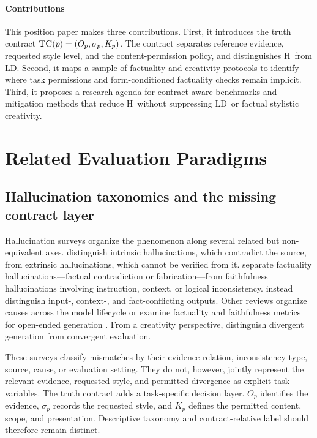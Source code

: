 \documentclass{clv2025}
\newcommand{\TC}{\textsc{TC}}
\newcommand{\LD}{\textsc{LD}}
\newcommand{\Hall}{\textsc{H}}
\begin{document}
\paragraph{Contributions}
This position paper makes three contributions.
First, it introduces the truth contract $\TC(p)=(O_p,\sigma_p,K_p)$.
The contract separates reference evidence, requested style level, and the content-permission policy, and distinguishes \Hall\ from \LD.
Second, it maps a sample of factuality and creativity protocols to identify where task permissions and form-conditioned factuality checks remain implicit.
Third, it proposes a research agenda for contract-aware benchmarks and mitigation methods that reduce \Hall\ without suppressing \LD\ or factual stylistic creativity.

\section{Related Evaluation Paradigms}\label{sec:related}

\subsection{Hallucination taxonomies and the missing contract layer}

Hallucination surveys organize the phenomenon along several related but non-equivalent axes.
\citet{ji_survey_2023} distinguish intrinsic hallucinations, which contradict the source, from extrinsic hallucinations, which cannot be verified from it.
\citet{huang_survey_2025} separate factuality hallucinations---factual contradiction or fabrication---from faithfulness hallucinations involving instruction, context, or logical inconsistency.
\citet{zhang_sirens_2025} instead distinguish input-, context-, and fact-conflicting outputs.
Other reviews organize causes across the model lifecycle or examine factuality and faithfulness metrics for open-ended generation \citep{wang_factuality_survey_2024,malin_faithfulness_review_2025,lamba_lifecycle_2026}.
From a creativity perspective, \citet{jiang_survey_2024} distinguish divergent generation from convergent evaluation.

These surveys classify mismatches by their evidence relation, inconsistency type, source, cause, or evaluation setting.
They do not, however, jointly represent the relevant evidence, requested style, and permitted divergence as explicit task variables.
The truth contract adds a task-specific decision layer.
$O_p$ identifies the evidence, $\sigma_p$ records the requested style, and $K_p$ defines the permitted content, scope, and presentation.
Descriptive taxonomy and contract-relative label should therefore remain distinct.
\end{document}
